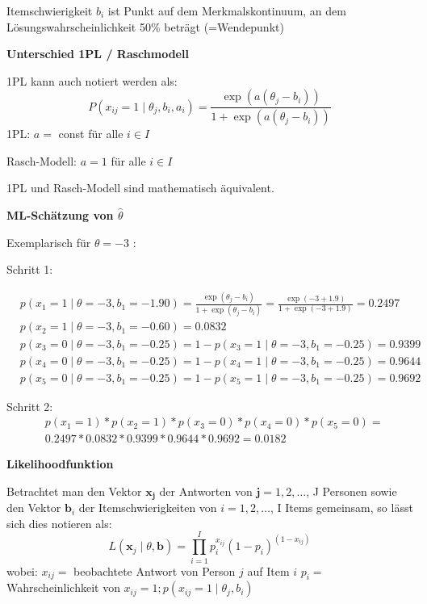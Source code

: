 \documentclass[10pt, letterpaper]{article}
\begin{document}
Itemschwierigkeit $b_i$ ist Punkt auf dem Merkmalskontinuum, an dem Lösungswahrscheinlichkeit 50\% beträgt (=Wendepunkt)


\textbf{Unterschied 1PL / Raschmodell}

1PL kann auch notiert werden als:
$$
P\left(x_{i j}=1 \mid \theta_j, b_i, a_i\right)=\frac{\exp \left(a\left(\theta_j-b_i\right)\right)}{1+\exp \left(a\left(\theta_j-b_i\right)\right)}
$$
1PL: $a=$ const für alle $i \in I$

Rasch-Modell: $a=1$ für alle $i \in I$

1PL und Rasch-Modell sind mathematisch äquivalent.


\textbf{ML-Schätzung von $\hat{\theta}$}

Exemplarisch für $\theta=-3$ :


Schritt 1:

$$
\begin{aligned}
& p\left(x_1=1 \mid \theta=-3, b_1=-1.90\right)=\frac{\exp \left(\theta_j-b_i\right)}{1+\exp \left(\theta_j-b_i\right)}=\frac{\exp (-3+1.9)}{1+\exp (-3+1.9)}=0.2497 \\
& p\left(x_2=1 \mid \theta=-3, b_1=-0.60\right)=0.0832 \\
& p\left(x_3=0 \mid \theta=-3, b_1=-0.25\right)=1-p\left(x_3=1 \mid \theta=-3, b_1=-0.25\right)=0.9399 \\
& p\left(x_4=0 \mid \theta=-3, b_1=-0.25\right)=1-p\left(x_4=1 \mid \theta=-3, b_1=-0.25\right)=0.9644 \\
& p\left(x_5=0 \mid \theta=-3, b_1=-0.25\right)=1-p\left(x_5=1 \mid \theta=-3, b_1=-0.25\right)=0.9692
\end{aligned}
$$

Schritt 2:
$$
\begin{aligned}
& p\left(x_1=1\right) * p\left(x_2=1\right) * p\left(x_3=0\right) * p\left(x_4=0\right) * p\left(x_5=0\right)= \\
& 0.2497 * 0.0832 * 0.9399 * 0.9644 * 0.9692=0.0182
\end{aligned}
$$




\textbf{Likelihoodfunktion}

Betrachtet man den Vektor $\boldsymbol{x}_{\boldsymbol{j}}$ der Antworten von $\boldsymbol{j}=1,2, \ldots$, J Personen sowie den Vektor $\boldsymbol{b}_i$ der Itemschwierigkeiten von $i=1,2, \ldots$, I Items gemeinsam, so lässt sich dies notieren als:
$$
L\left(\boldsymbol{x}_j \mid \theta, \boldsymbol{b}\right)=\prod_{i=1}^I p_i^{x_{i j}}\left(1-p_i\right)^{\left(1-x_{i j}\right)}
$$
wobei:
$x_{i j}=$ beobachtete Antwort von Person $j$ auf Item $i$
$p_i=$ Wahrscheinlichkeit von $x_{i j}=1 ; p\left(x_{i j}=1 \mid \theta_j, b_i\right)$
\end{document}
